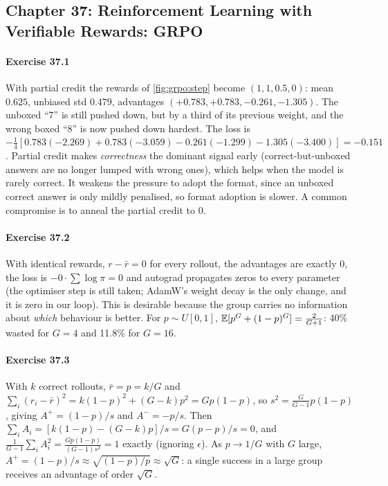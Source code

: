 \subsection*{Chapter 37: Reinforcement Learning with Verifiable Rewards: GRPO}

\paragraph{Exercise 37.1} With partial credit the rewards of \cref{fig:grpo:step} become
$(1,1,0.5,0)$: mean $0.625$, unbiased std $0.479$, advantages
$(+0.783,+0.783,-0.261,-1.305)$. The unboxed ``7'' is still pushed down, but by a third of
its previous weight, and the wrong boxed ``8'' is now pushed down hardest. The loss is
$-\frac14[0.783(-2.269)+0.783(-3.059)-0.261(-1.299)-1.305(-3.400)]=-0.151$. Partial credit
makes \emph{correctness} the dominant signal early (correct-but-unboxed answers are no longer
lumped with wrong ones), which helps when the model is rarely correct. It weakens the
pressure to adopt the format, since an unboxed correct answer is only mildly penalised, so
format adoption is slower. A common compromise is to anneal the partial credit to 0.

\paragraph{Exercise 37.2} With identical rewards, $r-\bar r=0$ for every rollout, the
advantages are exactly 0, the loss is $-0\cdot\sum\log\pi=0$ and autograd propagates zeros to
every parameter (the optimiser step is still taken; AdamW's weight decay is the only change,
and it is zero in our loop). This is desirable because the group carries no information about
\emph{which} behaviour is better. For $p\sim U[0,1]$,
$\mathbb{E}[p^G+(1-p)^G]=\frac2{G+1}$: 40\% wasted for $G=4$ and 11.8\% for $G=16$.

\paragraph{Exercise 37.3} With $k$ correct rollouts, $\bar r=p=k/G$ and
$\sum_i(r_i-\bar r)^2=k(1-p)^2+(G-k)p^2=Gp(1-p)$, so $s^2=\frac{G}{G-1}p(1-p)$, giving
$A^+=(1-p)/s$ and $A^-=-p/s$. Then $\sum_iA_i=[k(1-p)-(G-k)p]/s=G(p-p)/s=0$, and
$\frac1{G-1}\sum_iA_i^2=\frac{Gp(1-p)}{(G-1)s^2}=1$ exactly (ignoring $\epsilon$). As $p\to1/G$
with $G$ large, $A^+=(1-p)/s\approx\sqrt{(1-p)/p}\approx\sqrt{G}$: a single success in a large
group receives an advantage of order $\sqrt G$.


